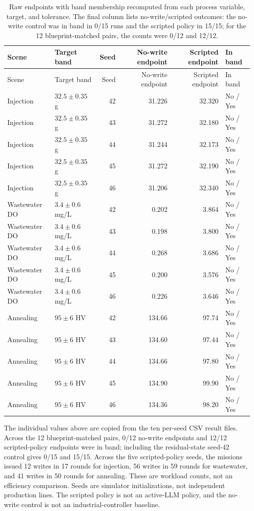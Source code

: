 \documentclass[10pt]{article}
\begin{document}
\begin{longtable}{@{}p{2.7cm}p{2.3cm}r r r >{\centering\arraybackslash}p{1.5cm}@{}}
\caption{Raw endpoints with band membership recomputed from each process variable, target, and tolerance. The final column lists no-write/scripted outcomes: the no-write control was in band in 0/15 runs and the scripted policy in 15/15; for the 12 blueprint-matched pairs, the counts were 0/12 and 12/12.}\label{tab:s7-opt}\\
\toprule
Scene & Target band & Seed & No-write endpoint & Scripted endpoint & In band \\
\midrule
\endfirsthead
\toprule
Scene & Target band & Seed & No-write endpoint & Scripted endpoint & In band \\
\midrule
\endhead
Injection & $32.5\pm0.35$ g & 42 & 31.226 & 32.320 & No / Yes \\
Injection & $32.5\pm0.35$ g & 43 & 31.272 & 32.180 & No / Yes \\
Injection & $32.5\pm0.35$ g & 44 & 31.244 & 32.173 & No / Yes \\
Injection & $32.5\pm0.35$ g & 45 & 31.272 & 32.190 & No / Yes \\
Injection & $32.5\pm0.35$ g & 46 & 31.206 & 32.340 & No / Yes \\
Wastewater DO & $3.4\pm0.6$ mg/L & 42 & 0.202 & 3.864 & No / Yes \\
Wastewater DO & $3.4\pm0.6$ mg/L & 43 & 0.198 & 3.800 & No / Yes \\
Wastewater DO & $3.4\pm0.6$ mg/L & 44 & 0.268 & 3.686 & No / Yes \\
Wastewater DO & $3.4\pm0.6$ mg/L & 45 & 0.200 & 3.576 & No / Yes \\
Wastewater DO & $3.4\pm0.6$ mg/L & 46 & 0.226 & 3.646 & No / Yes \\
Annealing & $95\pm6$ HV & 42 & 134.66 & 97.74 & No / Yes \\
Annealing & $95\pm6$ HV & 43 & 134.60 & 97.44 & No / Yes \\
Annealing & $95\pm6$ HV & 44 & 134.66 & 97.80 & No / Yes \\
Annealing & $95\pm6$ HV & 45 & 134.90 & 99.90 & No / Yes \\
Annealing & $95\pm6$ HV & 46 & 134.36 & 98.20 & No / Yes \\
\bottomrule
\end{longtable}

The individual values above are copied from the ten per-seed CSV result files. Across the 12 blueprint-matched pairs, 0/12 no-write endpoints and 12/12 scripted-policy endpoints were in band; including the residual-state seed-42 control gives 0/15 and 15/15. Across the five scripted-policy seeds, the missions issued 12 writes in 17 rounds for injection, 56 writes in 59 rounds for wastewater, and 41 writes in 50 rounds for annealing. These are workload counts, not an efficiency comparison. Seeds are simulator initializations, not independent production lines. The scripted policy is not an active-LLM policy, and the no-write control is not an industrial-controller baseline.
\end{document}
